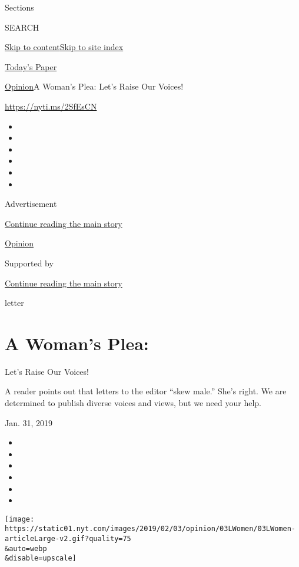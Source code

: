 Sections

SEARCH

\protect\hyperlink{site-content}{Skip to
content}\protect\hyperlink{site-index}{Skip to site index}

\href{https://myaccount.nytimes.com/auth/login?response_type=cookie\&client_id=vi}{}

\href{https://www.nytimes.com/section/todayspaper}{Today's Paper}

\href{/section/opinion}{Opinion}\textbar{}A Woman's Plea: Let's Raise
Our Voices!

\href{https://nyti.ms/2SfEsCN}{https://nyti.ms/2SfEsCN}

\begin{itemize}
\item
\item
\item
\item
\item
\item
\end{itemize}

Advertisement

\protect\hyperlink{after-top}{Continue reading the main story}

\href{/section/opinion}{Opinion}

Supported by

\protect\hyperlink{after-sponsor}{Continue reading the main story}

letter

\hypertarget{a-womans-plea}{%
\section{A Woman's Plea:}\label{a-womans-plea}}

Let's Raise Our Voices!

A reader points out that letters to the editor ``skew male.'' She's
right. We are determined to publish diverse voices and views, but we
need your help.

Jan. 31, 2019

\begin{itemize}
\item
\item
\item
\item
\item
\item
\end{itemize}

\texttt{[image: https://static01.nyt.com/images/2019/02/03/opinion/03LWomen/03LWomen-articleLarge-v2.gif?quality=75\\\&auto=webp\\\&disable=upscale]}

